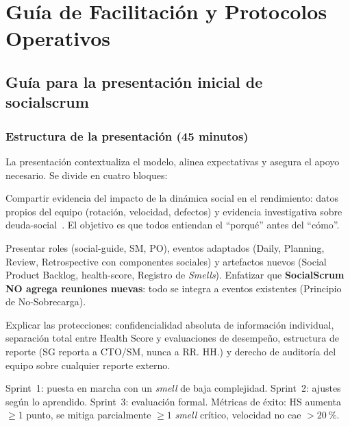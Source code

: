 \chapter{Guía de Facilitación y Protocolos Operativos}
\label{anexo:guias-facilitacion-protocolos-operativos}

\setlength{\parindent}{0pt}

\section{Guía para la presentación inicial de \gls{socialscrum}}

\subsection{Estructura de la presentación (45 minutos)}

La presentación contextualiza el modelo, alinea expectativas y asegura el apoyo necesario. Se divide en cuatro bloques:

\begin{description}[nosep, leftmargin=1.2cm, style=nextline]
    \item[Contexto y justificación (10 min)] Compartir evidencia del impacto de la dinámica social en el rendimiento: datos propios del equipo (rotación, velocidad, defectos) y evidencia investigativa sobre \gls{deuda-social}~\cite{tamburri2013socialdebt, saeeda2024nontechnicaldebt}. El objetivo es que todos entiendan el ``porqué'' antes del ``cómo''.

    \item[Explicación del modelo (15 min)] Presentar roles (\gls{social-guide}, SM, PO), eventos adaptados (Daily, Planning, Review, Retrospective con componentes sociales) y artefactos nuevos (Social Product Backlog, \gls{health-score}, Registro de \textit{Smells}). Enfatizar que \textbf{SocialScrum NO agrega reuniones nuevas}: todo se integra a eventos existentes (Principio de No-Sobrecarga).

    \item[Salvaguardas éticas (10 min)] Explicar las protecciones: confidencialidad absoluta de información individual, separación total entre Health Score y evaluaciones de desempeño, estructura de reporte (SG reporta a CTO/SM, nunca a RR. HH.) y derecho de auditoría del equipo sobre cualquier reporte externo.

    \item[Plan de implementación (10 min)] Sprint~1: puesta en marcha con un \textit{smell} de baja complejidad. Sprint~2: ajustes según lo aprendido. Sprint~3: evaluación formal. Métricas de éxito: HS aumenta $\geq 1$ punto, se mitiga parcialmente $\geq 1$ \textit{smell} crítico, velocidad no cae $>20~\%$.
\end{description}

